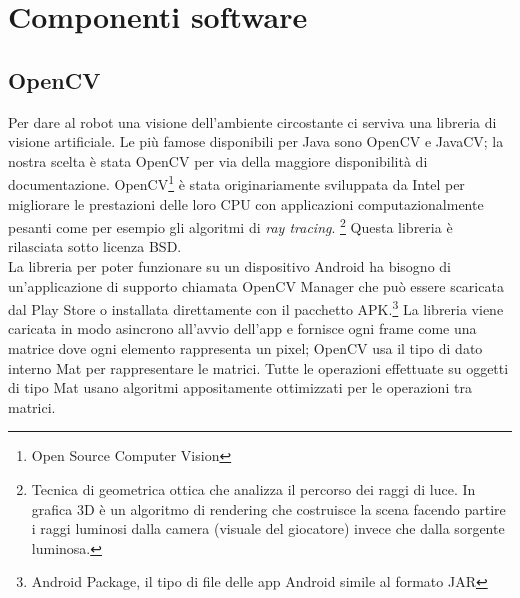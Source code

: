 \chapter{Componenti software}
\fancyfoot[C]{\thepage } 
\section {OpenCV}
Per dare al robot una visione dell'ambiente circostante ci serviva una libreria di 
visione artificiale. Le più famose disponibili per Java sono OpenCV e JavaCV; 
la nostra scelta è stata OpenCV per via della maggiore disponibilità di documentazione. 
OpenCV\footnote{Open Source Computer Vision} è stata originariamente sviluppata 
da Intel per migliorare le prestazioni delle loro CPU con applicazioni
computazionalmente pesanti come per esempio gli algoritmi di \textit{ray tracing}.
\footnote{Tecnica di geometrica ottica che analizza il percorso dei raggi di luce.
In grafica 3D è un algoritmo di rendering che costruisce la scena facendo
partire i raggi luminosi dalla camera (visuale del giocatore) invece che dalla 
sorgente luminosa.\cite{ray_tracing}} Questa libreria è rilasciata sotto licenza BSD. 
\\La libreria per poter funzionare su un 
 dispositivo Android ha bisogno di un'applicazione di supporto chiamata OpenCV 
 Manager che può essere scaricata dal Play Store o installata direttamente con il
 pacchetto APK.\footnote{Android Package, il tipo di file delle app Android simile 
 al formato JAR } La libreria viene caricata in modo asincrono all'avvio dell'app
 e fornisce ogni frame come una matrice dove ogni elemento rappresenta un pixel; 
 OpenCV usa il tipo di dato interno Mat per rappresentare le matrici.
 Tutte le operazioni effettuate su oggetti di tipo Mat usano algoritmi appositamente 
 ottimizzati per le operazioni tra matrici. 

